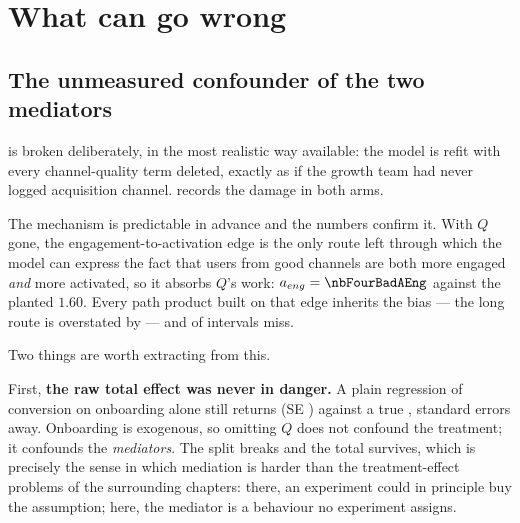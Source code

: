 \section{What can go wrong}
\label{sec:med:wrong}

\subsection*{The unmeasured confounder of the two mediators}

 is broken deliberately, in the most realistic way available: the model is refit with
every channel-quality term deleted, exactly as if the growth team had never logged acquisition
channel.  records the damage in both arms.

The mechanism is predictable in advance and the numbers confirm it. With $Q$ gone, the
engagement-to-activation edge is the only route left through which the model can express the fact
that users from good channels are both more engaged \emph{and} more activated, so it absorbs $Q$'s
work: $a_{eng} = \nbFourBadAEng$ against the planted $1.60$. Every path product built on that edge
inherits the bias --- the long route is overstated by \pc{\nbFourBadViaActErrPct} --- and
\nbFourBadNMiss{} of \nbFourNEstimands{} intervals miss.

Two things are worth extracting from this.

First, \textbf{the raw total effect was never in danger.} A plain regression of conversion on
onboarding alone still returns \nbFourBadOlsTotal{} (SE \nbFourBadOlsSe) against a true
\nbFourTrueTotal, \nbFourBadOlsZ{} standard errors away. Onboarding is exogenous, so omitting $Q$
does not confound the treatment; it confounds the \emph{mediators}. The split breaks and the total
survives, which is precisely the sense in which mediation is harder than the treatment-effect
problems of the surrounding chapters: there, an experiment could in principle buy the assumption;
here, the mediator is a behaviour no experiment assigns.

